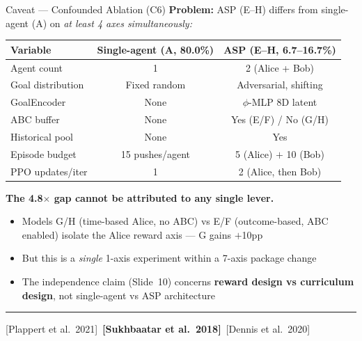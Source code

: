 \documentclass[aspectratio=169,xcolor=dvipsnames,t]{beamer}
\newcommand{\litfooter}[1]{%
  \vspace{2pt}%
  \hrule%
  \vspace{2pt}%
  {\tiny\color{LightDarkGrey} #1}%
}
\begin{document}
\begin{frame}[t]{Caveat — Confounded Ablation (C6)}
  \textbf{Problem:} ASP (E–H) differs from single-agent (A) on \emph{at least 4 axes simultaneously:}

  \vspace{4pt}
  {\footnotesize
  \begin{tabular}{lcc}
    \toprule
    \textbf{Variable} & \textbf{Single-agent (A, 80.0\%)} & \textbf{ASP (E–H, 6.7--16.7\%)} \\
    \midrule
    Agent count     & 1 & 2 (Alice + Bob) \\
    Goal distribution & Fixed random & Adversarial, shifting \\
    GoalEncoder     & None & $\phi$-MLP 8D latent \\
    ABC buffer      & None & Yes (E/F) / No (G/H) \\
    Historical pool & None & Yes \\
    Episode budget  & 15 pushes/agent & 5 (Alice) $+$ 10 (Bob) \\
    PPO updates/iter& 1 & 2 (Alice, then Bob) \\
    \bottomrule
  \end{tabular}
  }

  \vspace{4pt}
  {\small \textbf{The 4.8$\times$ gap cannot be attributed to any single lever.}
  \begin{itemize}
    \item Models G/H (time-based Alice, no ABC) vs E/F (outcome-based, ABC enabled) isolate the Alice reward axis — G gains $+$10pp
    \item But this is a \emph{single} 1-axis experiment within a 7-axis package change
    \item The independence claim (Slide~10) concerns \textbf{reward design vs curriculum design}, not single-agent vs ASP architecture
  \end{itemize}}

  \vfill\litfooter{[Plappert et al.\ 2021]~\textbf{[Sukhbaatar et al.\ 2018]}~[Dennis et al.\ 2020]}
\end{frame}
\end{document}
